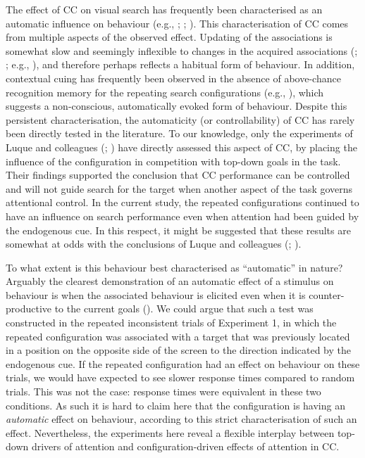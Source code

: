\documentclass[
  man,
  floatsintext,
  longtable,
  nolmodern,
  notxfonts,
  notimes,
  colorlinks=true,linkcolor=blue,citecolor=blue,urlcolor=blue]{apa7}
\begin{document}
The effect of CC on visual search has frequently been characterised as
an automatic influence on behaviour (e.g., ; ;
). This characterisation of
CC comes from multiple aspects of the observed effect. Updating of the
associations is somewhat slow and seemingly inflexible to changes in the
acquired associations (; ;
e.g., ), and therefore
perhaps reflects a habitual form of behaviour. In addition, contextual
cuing has frequently been observed in the absence of above-chance
recognition memory for the repeating search configurations (e.g.,
), which
suggests a non-conscious, automatically evoked form of behaviour.
Despite this persistent characterisation, the automaticity (or
controllability) of CC has rarely been directly tested in the
literature. To our knowledge, only the experiments of Luque and
colleagues (;
) have directly assessed
this aspect of CC, by placing the influence of the configuration in
competition with top-down goals in the task. Their findings supported
the conclusion that CC performance can be controlled and will not guide
search for the target when another aspect of the task governs
attentional control. In the current study, the repeated configurations
continued to have an influence on search performance even when attention
had been guided by the endogenous cue. In this respect, it might be
suggested that these results are somewhat at odds with the conclusions
of Luque and colleagues (;
).

To what extent is this behaviour best characterised as ``automatic'' in
nature? Arguably the clearest demonstration of an automatic effect of a
stimulus on behaviour is when the associated behaviour is elicited even
when it is counter-productive to the current goals
(). We could argue
that such a test was constructed in the repeated inconsistent trials of
Experiment 1, in which the repeated configuration was associated with a
target that was previously located in a position on the opposite side of
the screen to the direction indicated by the endogenous cue. If the
repeated configuration had an effect on behaviour on these trials, we
would have expected to see slower response times compared to random
trials. This was not the case: response times were equivalent in these
two conditions. As such it is hard to claim here that the configuration
is having an \emph{automatic} effect on behaviour, according to this
strict characterisation of such an effect. Nevertheless, the experiments
here reveal a flexible interplay between top-down drivers of attention
and configuration-driven effects of attention in CC.
\end{document}
